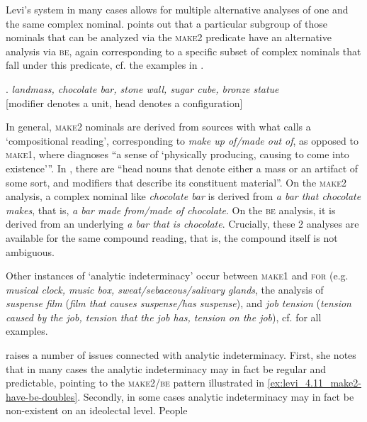 Levi's system in many cases allows for multiple alternative analyses of one and
the same complex nominal. \citet{Levi:1978} points out that a
particular subgroup of those nominals that can be analyzed via the
\textsc{make2} predicate have an alternative analysis via \textsc{be}, again
corresponding to a specific subset of complex nominals that fall under this predicate, cf. the
examples in \Next.

\ex. \label{ex:levi_4.11_make2-have-be-doubles} \emph{landmass, chocolate bar, stone wall, sugar cube, bronze statue}\\
{}[modifier denotes a unit, head denotes a configuration]

In general, \textsc{make2} nominals are derived from sources with what
\citet[90]{Levi:1978} calls a `compositional reading', corresponding to
\emph{make up of/made out of}, as opposed to \textsc{make1}, where
\citet[90]{Levi:1978} diagnoses ``a sense of `physically producing, causing to
come into existence'''. In \Last, there are ``head nouns that denote
either a mass or an artifact of some sort, and modifiers that describe its
constituent material''.  On the \textsc{make2} analysis, a complex nominal
like \emph{chocolate bar} is derived from \emph{a bar that chocolate makes},
that is, \emph{a bar made from/made of chocolate}. On the \textsc{be}
analysis, it is derived from an underlying \emph{a bar that is
  chocolate}. Crucially, these 2 analyses are available for the same
compound reading, that is, the compound itself is not
ambiguous.
\begin{sloppypar}
Other instances of `analytic indeterminacy' \citep[90]{Levi:1978}
occur between \textsc{make1} and \textsc{for} (e.g. \emph{musical clock,
  music box, sweat/sebaceous/salivary glands}, the
analysis of \emph{suspense film} (\emph{film that causes suspense/has
  suspense}), and \emph{job tension} (\emph{tension caused by the job, tension
that the job has, tension on the job}),  cf. \citet[91]{Levi:1978} for all examples. 
\end{sloppypar}
\citet[262--269]{Levi:1978} raises a number of issues connected with analytic indeterminacy. First, she notes that in many cases the
analytic indeterminacy may in fact be regular and predictable,
pointing to the \textsc{make2}/\textsc{be} pattern illustrated in
\ref{ex:levi_4.11_make2-have-be-doubles}. 
Secondly, in some cases analytic
indeterminacy may in fact be non-existent on an ideolectal level. People

